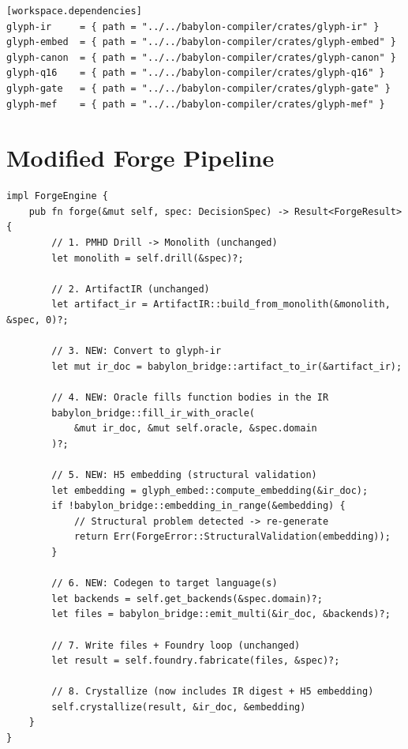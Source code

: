 \documentclass[11pt,a4paper,twoside]{article}
\theoremstyle{definition}
\theoremstyle{plain}
\theoremstyle{remark}
\begin{document}
\begin{lstlisting}[title={Workspace Cargo.toml additions}]
[workspace.dependencies]
glyph-ir     = { path = "../../babylon-compiler/crates/glyph-ir" }
glyph-embed  = { path = "../../babylon-compiler/crates/glyph-embed" }
glyph-canon  = { path = "../../babylon-compiler/crates/glyph-canon" }
glyph-q16    = { path = "../../babylon-compiler/crates/glyph-q16" }
glyph-gate   = { path = "../../babylon-compiler/crates/glyph-gate" }
glyph-mef    = { path = "../../babylon-compiler/crates/glyph-mef" }
\end{lstlisting}


\section{Modified Forge Pipeline}\label{sec:modforge}

\begin{lstlisting}[title={ForgeEngine with Babylon Bridge}]
impl ForgeEngine {
    pub fn forge(&mut self, spec: DecisionSpec) -> Result<ForgeResult> {
        // 1. PMHD Drill -> Monolith (unchanged)
        let monolith = self.drill(&spec)?;

        // 2. ArtifactIR (unchanged)
        let artifact_ir = ArtifactIR::build_from_monolith(&monolith, &spec, 0)?;

        // 3. NEW: Convert to glyph-ir
        let mut ir_doc = babylon_bridge::artifact_to_ir(&artifact_ir);

        // 4. NEW: Oracle fills function bodies in the IR
        babylon_bridge::fill_ir_with_oracle(
            &mut ir_doc, &mut self.oracle, &spec.domain
        )?;

        // 5. NEW: H5 embedding (structural validation)
        let embedding = glyph_embed::compute_embedding(&ir_doc);
        if !babylon_bridge::embedding_in_range(&embedding) {
            // Structural problem detected -> re-generate
            return Err(ForgeError::StructuralValidation(embedding));
        }

        // 6. NEW: Codegen to target language(s)
        let backends = self.get_backends(&spec.domain)?;
        let files = babylon_bridge::emit_multi(&ir_doc, &backends)?;

        // 7. Write files + Foundry loop (unchanged)
        let result = self.foundry.fabricate(files, &spec)?;

        // 8. Crystallize (now includes IR digest + H5 embedding)
        self.crystallize(result, &ir_doc, &embedding)
    }
}
\end{lstlisting}
\end{document}
